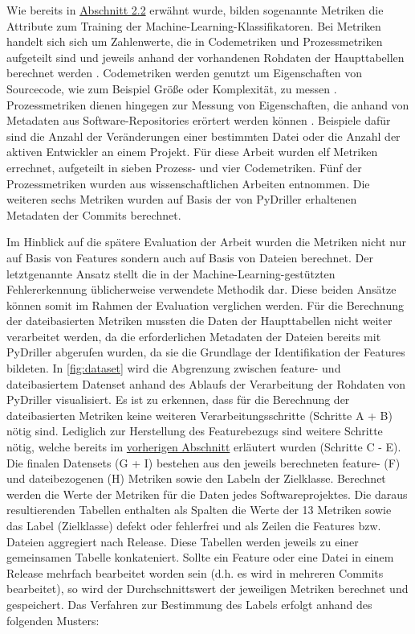 Wie bereits in \hyperref[classification]{Abschnitt 2.2} erwähnt wurde, bilden sogenannte Metriken die Attribute zum Training der Machine-Learning-Klassifikatoren. Bei Metriken handelt sich sich um Zahlenwerte, die in Codemetriken und Prozessmetriken aufgeteilt sind und jeweils anhand der vorhandenen Rohdaten der Haupttabellen berechnet werden \cite{Rahman2013}. Codemetriken werden genutzt um Eigenschaften von Sourcecode, wie zum Beispiel \glqq Größe\grqq{} oder Komplexität, zu messen \cite{Rahman2013}. Prozessmetriken dienen hingegen zur Messung von Eigenschaften, die anhand von Metadaten aus Software-Repositories erörtert werden können \cite{Rahman2013}. Beispiele dafür sind die Anzahl der Veränderungen einer bestimmten Datei oder die Anzahl der aktiven Entwickler an einem Projekt. Für diese Arbeit wurden elf Metriken errechnet, aufgeteilt in sieben Prozess- und vier Codemetriken. Fünf der Prozessmetriken wurden aus wissenschaftlichen Arbeiten \cite{Rahman2013,Queiroz2016} entnommen. Die weiteren sechs Metriken wurden auf Basis der von PyDriller erhaltenen Metadaten der Commits berechnet.

Im Hinblick auf die spätere Evaluation der Arbeit wurden die Metriken nicht nur auf Basis von Features sondern auch auf Basis von Dateien berechnet. Der letztgenannte Ansatz stellt die in der Machine-Learning-gestützten Fehlererkennung üblicherweise verwendete Methodik dar. Diese beiden Ansätze können somit im Rahmen der Evaluation verglichen werden. Für die Berechnung der dateibasierten Metriken mussten die Daten der Haupttabellen nicht weiter verarbeitet werden, da die erforderlichen Metadaten der Dateien bereits mit PyDriller abgerufen wurden, da sie die Grundlage der Identifikation der Features bildeten. In \autoref{fig:dataset} wird die Abgrenzung zwischen feature- und dateibasiertem Datenset anhand des Ablaufs der Verarbeitung der Rohdaten von PyDriller visualisiert. Es ist zu erkennen, dass für die Berechnung der dateibasierten Metriken keine weiteren Verarbeitungsschritte (Schritte A + B) nötig sind. Lediglich zur Herstellung des Featurebezugs sind weitere Schritte nötig, welche bereits im \hyperref[construction]{vorherigen Abschnitt} erläutert wurden (Schritte C - E). Die finalen Datensets (G + I) bestehen aus den jeweils berechneten feature- (F) und dateibezogenen (H) Metriken sowie den Labeln der Zielklasse. Berechnet werden die Werte der Metriken für die Daten jedes Softwareprojektes. Die daraus resultierenden Tabellen enthalten als Spalten die Werte der 13 Metriken sowie das Label (Zielklasse) \glqq defekt\grqq{} oder \glqq fehlerfrei\grqq{} und als Zeilen die Features bzw. Dateien aggregiert nach Release. Diese Tabellen werden jeweils zu einer gemeinsamen Tabelle konkateniert. Sollte ein Feature oder eine Datei in einem Release mehrfach bearbeitet worden sein (d.h. es wird in mehreren Commits bearbeitet), so wird der Durchschnittswert der jeweiligen Metriken berechnet und gespeichert. Das Verfahren zur Bestimmung des Labels erfolgt anhand des folgenden Musters:

